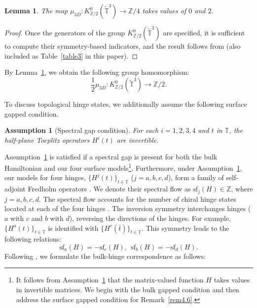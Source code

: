 \documentclass{amsart}
\theoremstyle{plain}
\newtheorem{lemma}[theorem]{Lemma}
\newtheorem{assumption}[theorem]{Assumption}
\theoremstyle{definition}
\theoremstyle{remark}
\newcommand{\Z}{\mathbb{Z}}
\newcommand{\T}{\mathbb{T}}
\newcommand{\tT}{\widetilde{\T}}
\renewcommand{\sf}{\mathrm{sf}}
\begin{document}
\begin{lemma}
\label{symindeven}
The map
$\mu_{3D} \colon K^0_{\Z/2}(\tT^3) \to \Z/4$
takes values of $0$ and $2$.
\end{lemma}

\begin{proof}
Once the generators of the group $K^0_{\Z/2}(\tT^3)$ are specified, it is sufficient to compute their symmetry-based indicators,
and the result follows from \cite[Figure~1]{Gomi15} (also included as Table~\ref{table3} in this paper).
\end{proof}
By Lemma~\ref{symindeven}, we obtain the following group homomorphism:
\begin{equation}
\label{1/2}
\frac{1}{2}\mu_{3D} \colon K^0_{\Z/2}(\tT^3) \to \Z/2.
\end{equation}

To discuss topological hinge states, we additionally assume the following surface gapped condition.

\begin{assumption}[Spectral gap condition]
\label{assumption3D}
For each $i=1,2,3,4$ and $t$ in $\T$, the half-plane Toeplitz operators $H^i(t)$ are invertible.
\end{assumption}

Assumption~\ref{assumption3D} is satisfied if a spectral gap is present for both the bulk Hamiltonian and our four surface models\footnote{
It follows from Assumption~\ref{assumption3D} that the matrix-valued function $H$ takes values in invertible matrices.
We begin with the bulk gapped condition and then address the surface gapped condition for Remark~\ref{rem4.6}.}.
Furthermore, under Assumption~\ref{assumption3D}, our models for four hinges, $\{ H^j(t) \}_{t \in \T}$ ($j=a,b,c,d$), form a family of self-adjoint Fredholm operators \cite{DH71,Pa90}.
We denote their spectral flow as $\sf_j(H) \in \Z$, where $j=a,b,c,d$.
The spectral flow accounts for the number of chiral hinge states located at each of the four hinges \cite{Hayashi2}.
The inversion symmetry interchanges hinges ($a$ with $c$ and $b$ with $d$), reversing the directions of the hinges.
For example, $\{ H^a(t) \}_{t \in \T}$ is identified with $\{ H^c(\bar{t}) \}_{t \in \T}$.
This symmetry leads to the following relations:
\begin{equation}
\label{inversionsf}
	\sf_a(H) = - \sf_c(H), \ \ \sf_b(H) = - \sf_d(H).
\end{equation}
Following \cite{TTM20a}, we formulate the bulk-hinge correspondence as follows:
\end{document}
